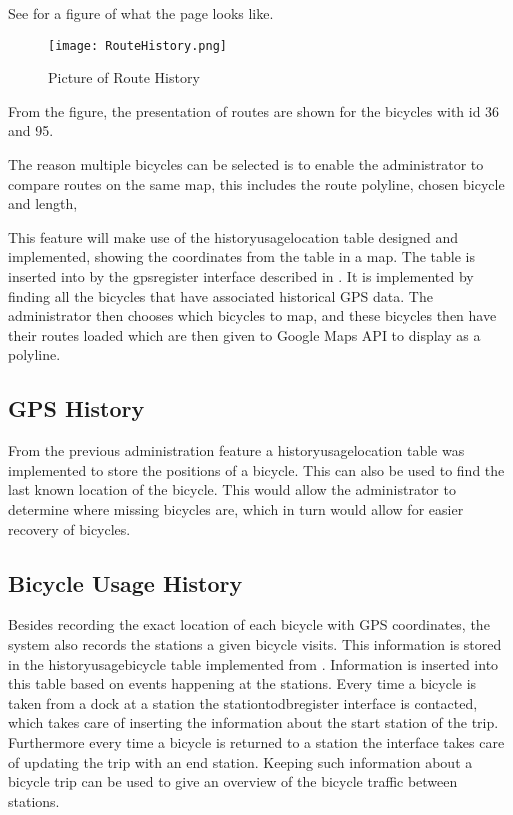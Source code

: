 See  for a figure of what the page looks like.

\begin{figure}[H]
	\centering
	\texttt{[image: RouteHistory.png]}
	\caption{Picture of Route History}
	\label{fig:routehistory}
\end{figure}

From the figure, the presentation of routes are shown for the bicycles with id 36 and 95.

The reason multiple bicycles can be selected is to enable the administrator to compare routes on the same map, this includes the route polyline, chosen bicycle and length,


This feature will make use of the historyusagelocation table designed and implemented, showing the coordinates from the table in a map.
The table is inserted into by the gpsregister interface described in .
It is implemented by finding all the bicycles that have associated historical GPS data.
The administrator then chooses which bicycles to map, and these bicycles then have their routes loaded which are then given to Google Maps API to display as a polyline.

\subsection{GPS History}\label{sec:gpsHistory}
From the previous administration feature a historyusagelocation table was implemented to store the positions of a bicycle.
This can also be used to find the last known location of the bicycle. 
This would allow the administrator to determine where missing bicycles are, which in turn would allow for easier recovery of bicycles.





\subsection{Bicycle Usage History}\label{sec:bicycleUsageHistory}

Besides recording the exact location of each bicycle with GPS coordinates, the system also records the stations a given bicycle visits.
This information is stored in the historyusagebicycle table implemented from .
Information is inserted into this table based on events happening at the stations. 
Every time a bicycle is taken from a dock at a station the stationtodbregister interface is contacted, which takes care of inserting the information about the start station of the trip.
Furthermore every time a bicycle is returned to a station the interface takes care of updating the trip with an end station.
Keeping such information about a bicycle trip can be used to give an overview of the bicycle traffic between stations.

